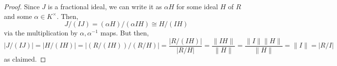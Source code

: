 \begin{proof}
	Since $J$ is a fractional ideal, we can write it as $\alpha H$ for some ideal $H$ of $R$ and some $\alpha \in K^\times$. Then,
	\[ J/(IJ) = (\alpha H)/(\alpha IH) \cong H/(IH) \]
	via the multiplication by $\alpha,\alpha^{-1}$ maps. But then,
	\[ |J/(IJ)| = |H/(IH)| = |(R/(IH))/(R/H)| = \frac{|R/(IH)|}{|R/H|} = \frac{\|IH\|}{\|H\|} = \frac{\|I\|\|H\|}{\|H\|} = \|I\| = |R/I| \]
	as claimed.
\end{proof}
